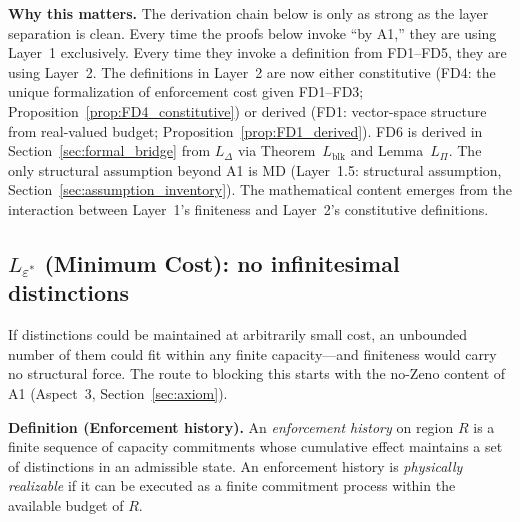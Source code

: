 \documentclass[11pt]{article}
\theoremstyle{remark}
\begin{document}
\medskip\noindent\textbf{Why this matters.}  The derivation chain below is only as strong as the layer separation is clean.  Every time the proofs below invoke ``by A1,'' they are using Layer~1 exclusively.  Every time they invoke a definition from FD1--FD5, they are using Layer~2.  The definitions in Layer~2 are now either constitutive (FD4: the unique formalization of enforcement cost given FD1--FD3; Proposition~\ref{prop:FD4_constitutive}) or derived (FD1: vector-space structure from real-valued budget; Proposition~\ref{prop:FD1_derived}).  FD6 is derived in Section~\ref{sec:formal_bridge} from $L_\Delta$ via Theorem~$L_{\mathrm{blk}}$ and Lemma~$L_\Pi$.  The only structural assumption beyond A1 is MD (Layer~1.5: structural assumption, Section~\ref{sec:assumption_inventory}).  The mathematical content emerges from the interaction between Layer~1's finiteness and Layer~2's constitutive definitions.

\subsection{\texorpdfstring{$L_{\varepsilon^*}$}{L epsilon*} (Minimum Cost): no infinitesimal distinctions}
\label{sec:eps_star}

If distinctions could be maintained at arbitrarily small cost, an unbounded number of them could fit within any finite capacity---and finiteness would carry no structural force.  The route to blocking this starts with the no-Zeno content of A1 (Aspect~3, Section~\ref{sec:axiom}).

\medskip\noindent\textbf{Definition (Enforcement history).}
An \emph{enforcement history} on region $R$ is a finite sequence of capacity commitments whose cumulative effect maintains a set of distinctions in an admissible state.  An enforcement history is \emph{physically realizable} if it can be executed as a finite commitment process within the available budget of $R$.
\end{document}
